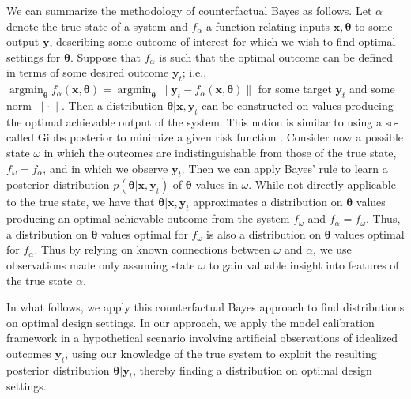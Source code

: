 \documentclass[twocolumn,10pt]{asme2ej}
\DeclareMathOperator*{\argmin}{argmin}
\begin{document}
%
We can summarize the methodology of counterfactual Bayes as follows.
%
Let $\alpha$ denote the true state of a system and $f_\alpha$ a function relating inputs $\mathbf x,\boldsymbol \theta$ to some output $\mathbf y$, describing some outcome of interest for which we wish to find optimal settings for $\boldsymbol\theta$. 
%
Suppose that $f_\alpha$ is such that the optimal outcome can be defined in terms of some desired outcome $\mathbf y_t$; i.e., $\argmin_{\boldsymbol\theta} f_\alpha(\mathbf x,\boldsymbol \theta)=\argmin_{\boldsymbol\theta} \lVert \mathbf y_{t} - f_\alpha(\mathbf x,\boldsymbol\theta)\rVert$ for some target $\mathbf y_t$ and some norm $\rVert \cdot \rVert$. 
%
Then a distribution $\boldsymbol\theta|\mathbf x,\mathbf y_{t}$ can be constructed on values producing the optimal achievable output of the system. This notion is similar to using a so-called Gibbs posterior to minimize a given risk function \cite{JiangTanner08}.
%
%
Consider now a possible state $\omega$ in which the outcomes are indistinguishable from those of the true state, $f_\omega=f_\alpha$, and in which we observe $\mathbf y_{t}$. 
%
Then we can apply Bayes' rule to learn a posterior distribution $p(\boldsymbol\theta|\mathbf x,\mathbf y_{t})$ of $\boldsymbol \theta$ values in $\omega$. 
%
While not directly applicable to the true state, we have that $\boldsymbol\theta|\mathbf x,\mathbf y_{t}$ approximates a distribution on $\boldsymbol \theta$ values producing an optimal achievable outcome from the system $f_\omega$ and $f_\alpha=f_\omega$. Thus, a distribution on $\boldsymbol \theta$ values optimal for $f_\omega$ is also a distribution on $\boldsymbol \theta$ values optimal for $f_\alpha$. 
%
Thus by relying on known connections between $\omega$ and $\alpha$, we use observations made only assuming state $\omega$ to gain valuable insight into features of the true state $\alpha$.
%

%
In what follows, we apply this counterfactual Bayes approach to find distributions on optimal design settings.
%
In our approach, we apply the model calibration framework \cite{Kennedy2001} in a hypothetical scenario involving artificial observations of idealized outcomes $\mathbf y_t$, using our knowledge of the true system to exploit the resulting posterior distribution $\boldsymbol\theta|\mathbf y_t$, thereby finding a distribution on optimal design settings.
\end{document}
